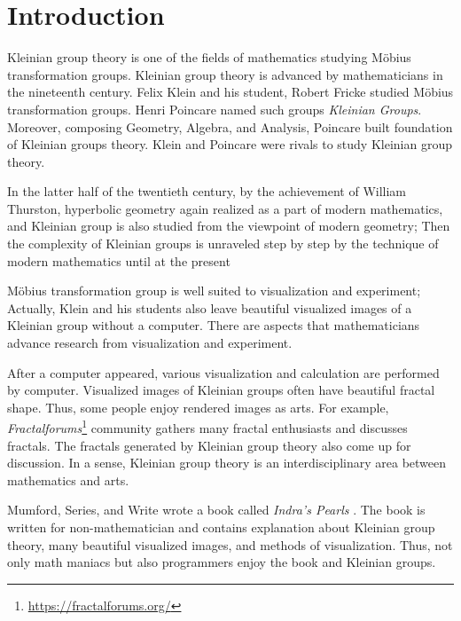 
\section{Introduction}

Kleinian group theory is one of the fields of mathematics studying 
M\"obius transformation groups.
Kleinian group theory is advanced by mathematicians in the nineteenth
century.
Felix Klein and his student, Robert Fricke studied M\"obius
transformation groups.
Henri Poincare named such groups \textit{Kleinian Groups}.
Moreover, composing Geometry, Algebra, and Analysis,
Poincare built foundation of Kleinian groups theory.
Klein and Poincare were rivals to study Kleinian group theory.


In the latter half of the twentieth century, by the achievement of William
Thurston, hyperbolic geometry again realized as a part of modern
mathematics, and Kleinian group is also studied from the viewpoint of
modern geometry;
Then the complexity of Kleinian groups is unraveled step by step by
the technique of modern mathematics until at the present

M\"obius transformation group is well suited to visualization and
experiment; Actually, Klein and his students also leave beautiful
visualized images of a Kleinian group without a computer.
There are aspects that mathematicians advance research from
visualization and experiment.

After a computer appeared, various visualization and calculation are
performed by computer.
Visualized images of Kleinian groups often have beautiful fractal shape.
Thus, some people enjoy rendered images as arts.
For example,
\textit{Fractalforums}\footnote{\url{https://fractalforums.org/}}
community gathers many fractal enthusiasts and discusses fractals.
The fractals generated by Kleinian group theory also come up for
discussion.
In a sense, Kleinian group theory is an interdisciplinary area between
mathematics and arts.

Mumford, Series, and Write wrote a book called
\textit{Indra's Pearls} \cite{MumfordSeriesWright200204}.
The book is written for non-mathematician and contains explanation
about Kleinian group theory, many beautiful visualized images, and
methods of visualization.
Thus, not only math maniacs but also programmers enjoy the book and
Kleinian groups.

